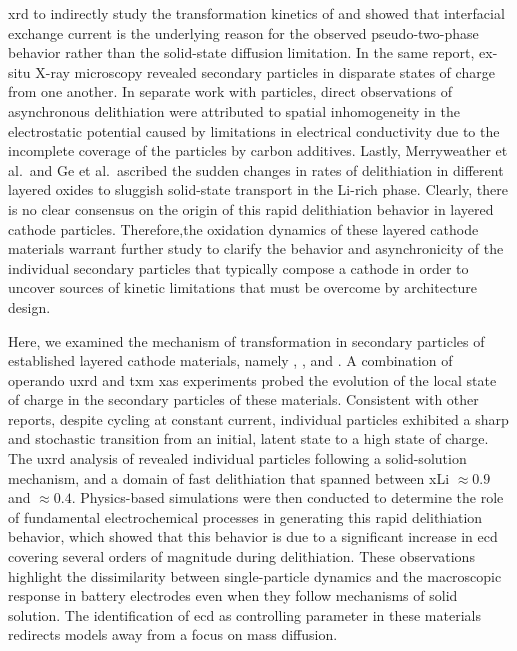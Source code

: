 \documentclass{WileyMSP-template}
\begin{document}
\gls{xrd} to indirectly study the transformation kinetics of
\nmc[333]{} and showed that interfacial exchange current is the
underlying reason for the observed pseudo-two-phase behavior rather
than the solid-state diffusion limitation. In the same report, ex-situ
X-ray microscopy revealed secondary particles in disparate states of
charge from one another. In separate work with \nmc[532]{}
particles,\cite{zhao2022} direct observations of asynchronous
delithiation were attributed to spatial inhomogeneity in the
electrostatic potential caused by limitations in electrical
conductivity due to the incomplete coverage of the particles by carbon
additives. Lastly, Merryweather et al.\cite{rao2021}\ and Ge et
al.\cite{wang2020-6}\ ascribed the sudden changes in rates of
delithiation in different layered oxides to sluggish solid-state
transport in the Li-rich phase. Clearly, there is no clear consensus
on the origin of this rapid delithiation behavior in layered cathode
particles. Therefore,the oxidation dynamics of these layered cathode
materials warrant further study to clarify the behavior and
asynchronicity of the individual secondary particles that typically
compose a cathode in order to uncover sources of kinetic limitations
that must be overcome by architecture design.

Here, we examined the mechanism of transformation in secondary
particles of established layered cathode materials, namely \nca{},
\nmc[333]{}, and \nmc[532]{}. A combination of operando \gls{uxrd} and
\gls{txm} \gls{xas} experiments probed the evolution of the local
state of charge in the secondary particles of these
materials. Consistent with other reports, despite cycling at constant
current, individual particles exhibited a sharp and stochastic
transition from an initial, latent state to a high state of
charge. The \gls{uxrd} analysis of \nca{} revealed individual
particles following a solid-solution mechanism, and a domain of fast
delithiation that spanned between \gls{xLi} $\approx 0.9$ and $\approx
0.4$.  Physics-based simulations were then conducted to determine the
role of fundamental electrochemical processes in generating this rapid
delithiation behavior, which showed that this behavior is due to a
significant increase in \gls{ecd} covering several orders of magnitude
during delithiation. These observations highlight the dissimilarity
between single-particle dynamics and the macroscopic response in
battery electrodes even when they follow mechanisms of solid
solution. The identification of \gls{ecd} as controlling parameter in
these materials redirects models away from a focus on mass diffusion.
\end{document}
